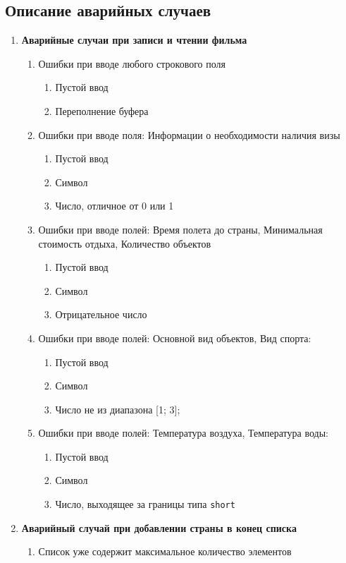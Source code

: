 \subsection{Описание аварийных случаев}
\begin{enumerate}
	\item\textbf{Аварийные случаи при записи и чтении фильма}
	\begin{enumerate}
		\item Ошибки при вводе любого строкового поля
		\begin{enumerate}
			\item Пустой ввод 
			\item Переполнение буфера
		\end{enumerate}
		\item Ошибки при вводе поля: Информации о необходимости наличия визы
		\begin{enumerate}
			\item Пустой ввод 
			\item Символ
			\item Число, отличное от 0 или 1
		\end{enumerate}
		\item Ошибки при вводе полей: Время полета до страны, Минимальная стоимость отдыха, Количество объектов
		\begin{enumerate}
			\item Пустой ввод 
			\item Символ
			\item Отрицательное число
		\end{enumerate}
		\item Ошибки при вводе полей: Основной вид объектов, Вид спорта:
		\begin{enumerate}
			\item Пустой ввод 
			\item Символ
			\item Число не из диапазона [1; 3];
		\end{enumerate}
		\item Ошибки при вводе полей: Температура воздуха, Температура воды:
		\begin{enumerate}
			\item Пустой ввод 
			\item Символ
			\item Число, выходящее за границы типа \texttt{short}
		\end{enumerate}
	\end{enumerate}
	
	\item\textbf{Аварийный случай при добавлении страны в конец списка}
	\begin{enumerate}
		\item Список уже содержит максимальное количество элементов
	\end{enumerate}
	

\end{enumerate}
